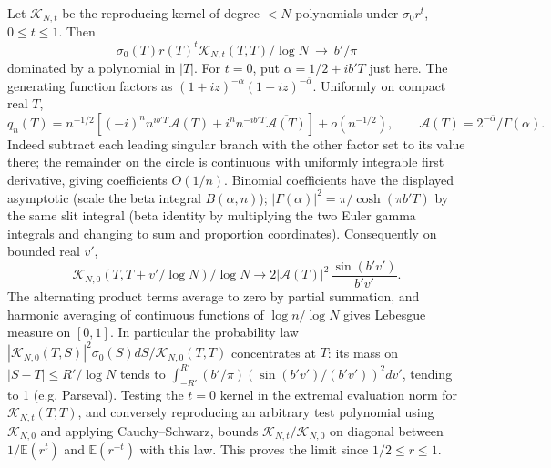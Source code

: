 Let \(\mathcal K_{N,t}\) be the reproducing kernel of degree \(<N\) polynomials under \(\sigma_0 r^t\), \(0\le t\le1\). Then
\[
 \sigma_0(T)r(T)^t\mathcal K_{N,t}(T,T)/\log N\ \longrightarrow\ b'/\pi
\]
dominated by a polynomial in \(|T|\). For \(t=0\), put \(\alpha=1/2+i b'T\) just here. The generating function factors as \((1+i z)^{-\alpha}(1-i z)^{-\bar\alpha}\). Uniformly on compact real \(T\),
\[
 q_n(T)=n^{-1/2}[(-i)^n n^{i b'T}\mathcal A(T)+i^n n^{-i b'T}\overline{\mathcal A(T)}]+o(n^{-1/2}),
 \qquad \mathcal A(T)=2^{-\bar\alpha}/\Gamma(\alpha).
\]
Indeed subtract each leading singular branch with the other factor set to its value there; the remainder on the circle is continuous with uniformly integrable first derivative, giving coefficients \(O(1/n)\). Binomial coefficients have the displayed asymptotic (scale the beta integral \(B(\alpha,n)\)); \(|\Gamma(\alpha)|^2=\pi/\cosh(\pi b'T)\) by the same slit integral (beta identity by multiplying the two Euler gamma integrals and changing to sum and proportion coordinates). Consequently on bounded real \(v'\),
\[
 \mathcal K_{N,0}(T,T+v'/\log N)/\log N\longrightarrow
       2|\mathcal A(T)|^2\,\frac{\sin(b'v')}{b'v'} .
\]
The alternating product terms average to zero by partial summation, and harmonic averaging of continuous functions of \(\log n/\log N\) gives Lebesgue measure on \([0,1]\). In particular the probability law \(|\mathcal K_{N,0}(T,S)|^2\sigma_0(S)dS/\mathcal K_{N,0}(T,T)\) concentrates at \(T\): its mass on \(|S-T|\le R'/\log N\) tends to \(\int_{-R'}^{R'}(b'/\pi)(\sin(b'v')/(b'v'))^2dv'\), tending to 1 (e.g. Parseval). Testing the \(t=0\) kernel in the extremal evaluation norm for \(\mathcal K_{N,t}(T,T)\), and conversely reproducing an arbitrary test polynomial using \(\mathcal K_{N,0}\) and applying Cauchy--Schwarz, bounds \(\mathcal K_{N,t}/\mathcal K_{N,0}\) on diagonal between \(1/\mathbb E(r^t)\) and \(\mathbb E(r^{-t})\) with this law. This proves the limit since \(1/2\le r\le1\).

